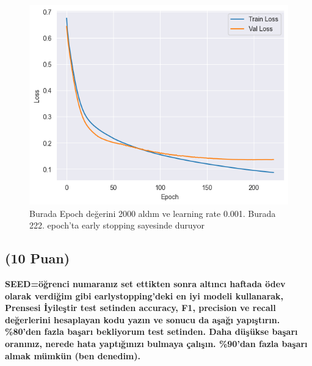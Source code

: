 \documentclass[11pt]{article}
\begin{document}
\begin{figure}
    \centering
    \includegraphics{soru5.png}
    \caption{Burada Epoch değerini 2000 aldım ve learning rate 0.001. Burada 222. epoch'ta early stopping sayesinde duruyor }
    \label{fig:my_pic}
\end{figure}

\pagebreak

\subsection{(10 Puan)} \textbf{SEED=öğrenci numaranız set ettikten sonra altıncı haftada ödev olarak verdiğim gibi earlystopping'deki en iyi modeli kullanarak, Prensesi İyileştir test setinden accuracy, F1, precision ve recall değerlerini hesaplayan kodu yazın ve sonucu da aşağı yapıştırın. \%80'den fazla başarı bekliyorum test setinden. Daha düşükse başarı oranınız, nerede hata yaptığınızı bulmaya çalışın. \%90'dan fazla başarı almak mümkün (ben denedim).}
\end{document}
